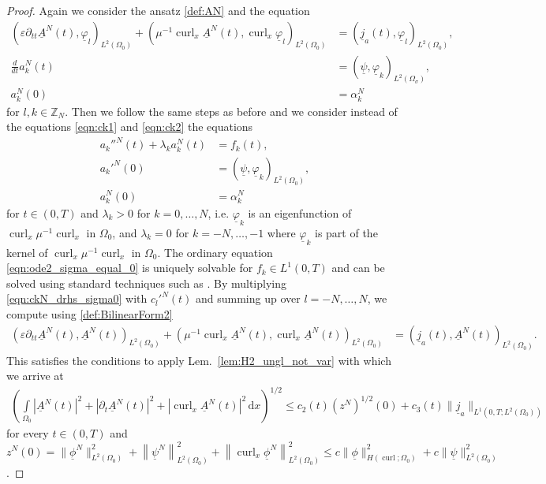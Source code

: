 \documentclass[a4paper,11pt]{article}
\newcommand{\Z}{\mathbb Z}
\newcommand{\omsig}{\Omega_{\sigma}}
\newcommand{\cu}{\operatorname{curl}}
\renewcommand{\vec}[1]{\underline{#1}}
\newcommand{\abs}[1]{\left\lvert{#1}\right\rvert}
\newcommand{\norm}[1]{{\left\lVert{#1}\right\rVert}}
\begin{document}
\begin{proof}
	 Again we consider the ansatz \eqref{def:AN} and the equation
		\begin{align}
			\nonumber
			(\varepsilon\partial_{tt}\vec A^N(t) ,\vec\varphi_l)_{L^2(\Omega_0)}  +(\mu^{-1}\cu_x  \vec A^N(t) ,\cu_x \vec\varphi_l)_{L^2(\Omega_0)}	&=(\vec j_a(t),\vec \varphi_l)_{L^2(\Omega_0)},\\
			\label{eqn:ckN_drhs_sigma0}
			\frac{d}{dt} a_k^N(t)&=(\vec \psi,\vec \varphi_k)_{L^2(\omsig)},\\
			\nonumber
			a_k^N(0) &=\alpha_k^N
		\end{align}
		for $l,k \in \Z_N$.
		Then we follow the same steps as before and we consider instead of the equations \eqref{eqn:ck1} and \eqref{eqn:ck2} the equations
		\begin{align}
			\nonumber
			a_k''^N(t)+ \lambda_k a_k^N(t) &= f_k(t),\\	
			\label{eqn:ode2_sigma_equal_0}
			a_k'^N(0) &= (\vec \psi,\vec \varphi_k)_{L^2(\Omega_0)},\\
			\nonumber
			a_k^N (0) &=\alpha_k^N
		\end{align}
		for $t\in (0,T)$ and $\lambda_k>0$ for  $k=0,\dots,N$, i.e. $\vec \varphi_k$  is an eigenfunction of $\cu_x\mu^{-1}\cu_x$ in $\Omega_0$, and $\lambda_k=0$ for $k=-N,\dots,-1$ 
		where $\vec \varphi_k$  is part of the kernel of $\cu_x\mu^{-1}\cu_x$ in $\Omega_0$. The ordinary equation \eqref{eqn:ode2_sigma_equal_0} is uniquely solvable for $f_k\in L^1(0,T)$ and can be solved using standard techniques such as \cite[L.~20, L.~21]{tenenbaum1985ordinary}. By multiplying \eqref{eqn:ckN_drhs_sigma0} with  $c_l'^N(t)$ and summing up over $l=-N,\dots,N$, we compute using \eqref{def:BilinearForm2}
		\begin{align*}
			(\varepsilon\partial_{tt}\vec A^N(t) ,\vec A^N(t))_{L^2(\Omega_0)}  +(\mu^{-1}\cu_x  \vec A^N(t) ,\cu_x \vec A^N(t))_{L^2(\Omega_0)}	&=(\vec j_a(t),\vec A^N(t))_{L^2(\Omega_0)}.
		\end{align*}
		This satisfies the conditions to apply Lem.~\ref{lem:H2_ungl_not_var} with which we arrive at
		\begin{align*}
			\left(\int\limits_{\Omega_0}\abs{\vec A^N(t)}^2+\abs{\partial_t \vec A^N(t)}^2 +\abs{\cu_x \vec A^N(t)}^2\,\mathrm dx\right)^{1/2} \leq c_2(t) (z^{N})^{ 1/2}(0)+c_3(t) \|\vec j_a\|_{L^1(0,T;L^2(\Omega_0))}
		\end{align*}
		for every $t\in(0,T)$ and 	
		$z^N(0) = \|\vec \phi^{N}\|_{L^2(\Omega_0)}^2+\norm{\vec \psi^N}_{L^2(\Omega_0)}^2 +\norm{\cu_x \vec \phi^N}_{L^2(\Omega_0)}^2 \leq c\|\vec \phi\|^2_{H(\cu;\Omega_0)} + c \|\vec \psi\|^2_{L^2(\Omega_0)}$.

\end{proof}
\end{document}
